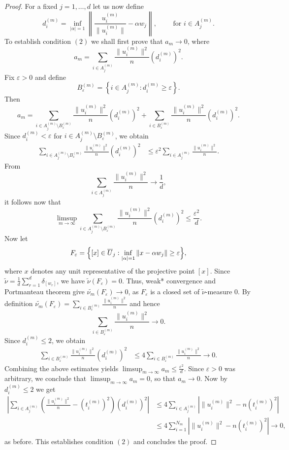 \documentclass[12pt, reqno]{amsart}
\theoremstyle{definition}
\theoremstyle{remark}
\numberwithin{equation}{section}
\begin{document}
\begin{proof}
For a fixed $j = 1,\ldots,d$ let us now define
$$ d_i^{(m)} = \inf_{|\alpha|=1} \left\| \frac{u_i^{(m)}}{\|u_i^{(m)}\|} - \alpha w_j \right\|, \qquad \text{ for } i\in A_j^{(m)}. $$  
To establish condition $(2)$ we shall first prove that $a_m \to 0$, where
$$ a_m = \sum_{i\in A_j^{(m)}} \frac{\|u_i^{(m)}\|^2}{n} \left(d_i^{(m)}\right)^2. $$ Fix $\varepsilon>0$ and define 
$$ B_\varepsilon^{(m)} = \left\{ i\in A_j^{(m)}: d_i^{(m)}\geq \varepsilon \right\}. $$ Then 
$$a_m = \sum_{i\in A_j^{(m)}\setminus B_\varepsilon^{(m)}} \frac{\|u_i^{(m)}\|^2}{n} \left(d_i^{(m)}\right)^2 + \sum_{i\in B_\varepsilon^{(m)}} \frac{\|u_i^{(m)}\|^2}{n} \left(d_i^{(m)}\right)^2.$$ 
Since $d_i^{(m)}<\varepsilon$ for $i\in A_j^{(m)}\setminus B_\varepsilon^{(m)}$, we obtain 
\begin{align*} \sum_{i\in A_j^{(m)}\setminus B_\varepsilon^{(m)}} \frac{\|u_i^{(m)}\|^2}{n} \left(d_i^{(m)}\right)^2 &\leq \varepsilon^2 \sum_{i\in A_j^{(m)}} \frac{\|u_i^{(m)}\|^2}{n}. \end{align*}
From $$ \sum_{i\in A_j^{(m)}} \frac{\|u_i^{(m)}\|^2}{n} \to \frac1d, $$ it follows now that 
$$ \limsup_{m\to\infty} \sum_{i\in A_j^{(m)}\setminus B_\varepsilon^{(m)}} \frac{\|u_i^{(m)}\|^2}{n} \left(d_i^{(m)}\right)^2 \leq \frac{\varepsilon^2}{d}.$$
Now let 
$$ F_\varepsilon = \Bigl\{ [x]\in \overline{U}_j: \inf_{|\alpha|=1} \left\| x - \alpha w_j \right\|\geq \varepsilon \Bigr\},$$
where $x$ denotes any unit representative of the projective point $[x]$. Since $ \widetilde{\nu}=\frac1d\sum_{r=1}^{d}\delta_{[w_r]}$, we have $ \widetilde{\nu}(F_\varepsilon)=0$. Thus, weak* convergence and Portmanteau theorem give $ \widetilde{\nu_m}(F_\varepsilon) \to 0$, as $F_{\varepsilon}$ is a closed set of $\widetilde{\nu}$-measure $0$. By definition $ \widetilde{\nu_m}(F_\varepsilon) = \sum_{i\in B_\varepsilon^{(m)}} \frac{\|u_i^{(m)}\|^2}{n}$ and hence
$$ \sum_{i\in B_\varepsilon^{(m)}} \frac{\|u_i^{(m)}\|^2}{n} \to 0. $$
Since $d_i^{(m)}\leq 2$, we obtain 
\begin{align*} \sum_{i\in B_\varepsilon^{(m)}} \frac{\|u_i^{(m)}\|^2}{n} \left(d_i^{(m)}\right)^2 &\leq 4 \sum_{i\in B_\varepsilon^{(m)}} \frac{\|u_i^{(m)}\|^2}{n} \to 0. \end{align*} 
Combining the above estimates yields $ \limsup_{m\to\infty} a_m \leq \frac{\varepsilon^2}{d}.$  Since $\varepsilon>0$ was arbitrary, we conclude that $ \limsup_{m\to\infty} a_m=0$, so that $a_m \to 0$. Now by $d_i^{(m)}\leq 2$ we get
\begin{align*}
\left |\sum_{i\in A_j^{(m)}} \left ( \frac{\|u_i^{(m)}\|^2}{n} - (t_i^{(m)})^2 \right ) \left(d_i^{(m)}\right)^2 \right | &\leq 4 \sum_{i\in A_j^{(m)}} \left| \|u_i^{(m)}\|^2 - n(t_i^{(m)})^2 \right| \\
&\leq 4 \sum_{i=1}^{N_m} \left| \|u_i^{(m)}\|^2 - n(t_i^{(m)})^2 \right| \to 0,
\end{align*}
as before. This establishes condition $(2)$ and concludes the proof.

\end{proof}
\end{document}
